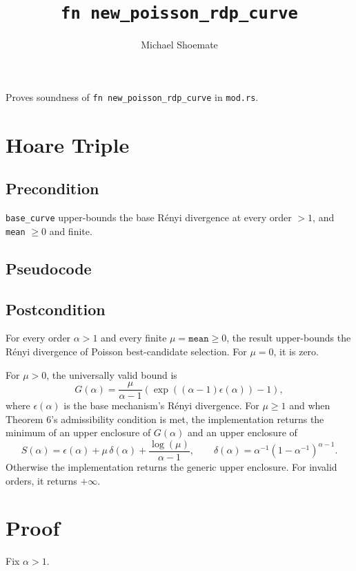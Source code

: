 \documentclass{article}
\title{\texttt{fn new\_poisson\_rdp\_curve}}
\author{Michael Shoemate}
\begin{document}
\maketitle

Proves soundness of \texttt{fn new\_poisson\_rdp\_curve} in \texttt{mod.rs}.

\section{Hoare Triple}
\subsection*{Precondition}
\texttt{base\_curve} upper-bounds the base Rényi divergence at every order $> 1$, and
\texttt{mean} $\ge 0$ and finite.

\subsection*{Pseudocode}


\subsection*{Postcondition}
\begin{theorem}
\label{postcondition}
For every order $\alpha>1$ and every finite $\mu=\texttt{mean}\ge0$,
the result upper-bounds the Rényi divergence of Poisson
best-candidate selection. For $\mu=0$, it is zero.

For $\mu>0$, the universally valid bound is
\[
G(\alpha)=\frac{\mu}{\alpha-1}
\left(\exp((\alpha-1)\epsilon(\alpha))-1\right),
\]
where $\epsilon(\alpha)$ is the base mechanism's Rényi divergence.
For $\mu\ge1$ and when Theorem 6's admissibility condition is met,
the implementation returns the minimum of an upper enclosure of $G(\alpha)$
and an upper enclosure of
\[
S(\alpha)=\epsilon(\alpha)+\mu\,\delta(\alpha)
+\frac{\log(\mu)}{\alpha-1},
\qquad
\delta(\alpha)=\alpha^{-1}(1-\alpha^{-1})^{\alpha-1}.
\]
Otherwise the implementation returns the generic upper enclosure.
For invalid orders, it returns $+\infty$.
\end{theorem}

\section{Proof}
Fix $\alpha > 1$.
\end{document}

